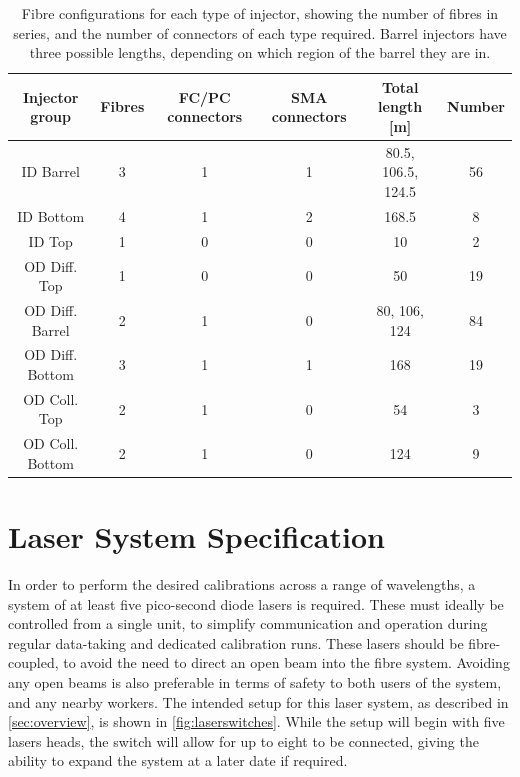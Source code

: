\documentclass[a4paper,11pt]{article}
\begin{document}
\begin{table}[h]
\centering
\setlength{\tabcolsep}{4pt}
\begin{tabular}{cccccc}
\toprule	
Injector group	&	Fibres	&	FC/PC connectors	&	SMA connectors		&	Total length [m]	& Number	\\ \midrule
ID Barrel   &   3   &   1   &   1   &   80.5, 106.5, 124.5  &   56  \\
ID Bottom   &   4   &   1   &   2   &   168.5 &   8   \\
ID Top      &   1   &   0   &   0   &   10  &   2   \\
OD Diff. Top    &   1   &   0   &   0   &   50  &   19  \\
OD Diff. Barrel &   2   &   1   &   0   &   80, 106, 124  & 84  \\
OD Diff. Bottom &   3   &   1   &   1   &   168 &   19  \\
OD Coll. Top    &   2   &   1   &   0   &   54  &   3   \\
OD Coll. Bottom &   2   &   1   &   0   &   124 &   9   \\
\bottomrule
\end{tabular}
\caption{Fibre configurations for each type of injector, showing the number of fibres in series, and the number of connectors of each type required. Barrel injectors have three possible lengths, depending on which region of the barrel they are in.}\label{tab:fibreConfigIntro}
\end{table}


\section{Laser System Specification}\label{sec:laser}
In order to perform the desired calibrations across a range of wavelengths, a system of at least five pico-second diode lasers is required. These must ideally be controlled from a single unit, to simplify communication and operation during regular data-taking and dedicated calibration runs. These lasers should be fibre-coupled, to avoid the need to direct an open beam into the fibre system. Avoiding any open beams is also preferable in terms of safety to both users of the system, and any nearby workers. The intended setup for this laser system, as described in \cref{sec:overview}, is shown in \cref{fig:laserswitches}. While the setup will begin with five lasers heads, the switch will allow for up to eight to be connected, giving the ability to expand the system at a later date if required.
\end{document}
